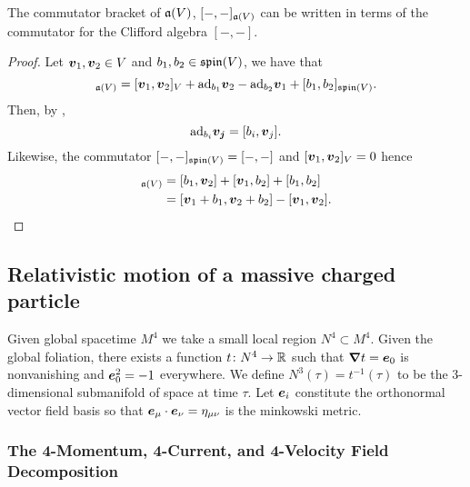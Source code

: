 \documentclass[conf]{new-aiaa}
\begin{document}
\begin{proposition}
The commutator bracket of $\mathfrak{a}(V)$, $[-,-]_{\mathfrak{a}(V)}$ can be written in terms of the commutator for the Clifford algebra $[-,-]$.
\end{proposition}
\begin{proof}
Let $\boldsymbol{v}_1,\boldsymbol{v}_2\in V$ and $b_1,b_2 \in \mathfrak{spin}(V)$, we have that 
\begin{equation}
[\blade{v}_1+b_1,\blade{v}_2+b_2]_{\liealg(V)} = [\blade{v}_1,\blade{v}_2]_{V}+\mathrm{ad}_{b_1}\blade{v}_2 - \mathrm{ad}_{b_2}\blade{v}_1 + [b_1,b_2]_{\spina(V)}.
\end{equation}
Then, by \cite[Lemma 5.7]{gracia-bondia_elements_2001}, 
\begin{equation}
\mathrm{ad}_{b_i}\boldsymbol{v_j}=[b_i,\boldsymbol{v}_j].
\end{equation}
Likewise, the commutator $[-,-]_{\mathfrak{spin}(V)}=[-,-]$ and $[\boldsymbol{v}_1,\boldsymbol{v}_2]_V=0$ hence
\begin{align}
[\blade{v}_1 + b_1,\blade{v}_2+b_2]_{\liealg(V)} &= [b_1,\blade{v}_2] + [\blade{v}_1,b_2] + [b_1,b_2]\\
&= [\blade{v}_1+b_1,\blade{v}_2+b_2]-[\blade{v}_1,\blade{v}_2].
\end{align}
\end{proof}

\subsection{Relativistic motion of a massive charged particle}

Given global spacetime $M^4$ we take a small local region $N^4\subset M^4$. Given the global foliation, there exists a function $t \colon N^4 \to \mathbb{R}$ such that $\boldsymbol{\nabla} t = \boldsymbol{e}_0$ is nonvanishing and $\boldsymbol{e}_0^2=-1$ everywhere. We define $N^3(\tau)=t^{-1}(\tau)$ to be the 3-dimensional submanifold of space at time $\tau$. Let $\boldsymbol{e}_i$ constitute the orthonormal vector field basis so that $\boldsymbol{e}_\mu \cdot \boldsymbol{e}_\nu = \eta_{\mu \nu}$ is the minkowski metric. 

\subsubsection{The 4-Momentum, 4-Current, and 4-Velocity Field Decomposition}
\end{document}
